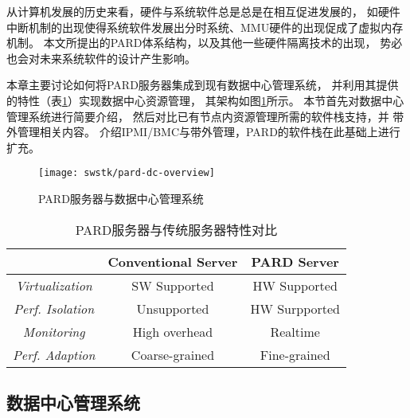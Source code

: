 
从计算机发展的历史来看，硬件与系统软件总是总是在相互促进发展的，
如硬件中断机制的出现使得系统软件发展出分时系统、MMU硬件的出现促成了虚拟内存机制。
本文所提出的PARD体系结构，以及其他一些硬件隔离技术的出现\cite{intel-rdt}，
势必也会对未来系统软件的设计产生影响。

本章主要讨论如何将PARD服务器集成到现有数据中心管理系统，
并利用其提供的特性（表\ref{tab:pard-features}）实现数据中心资源管理，
其架构如图\ref{fig:pard-dc-overview}所示。
本节首先对数据中心管理系统进行简要介绍，
然后对比已有节点内资源管理所需的软件栈支持，并
带外管理相关内容。 介绍IPMI/BMC与带外管理，PARD的软件栈在此基础上进行扩充。

\begin{figure}[tb]
  \centering
  \texttt{[image: swstk/pard-dc-overview]}
  \caption{PARD服务器与数据中心管理系统}
  \label{fig:pard-dc-overview}
\end{figure}

\begin{table}[tb]
\begin{center}
\begin{tabular}{c|c|c}
  \toprule[1.5pt]
  & \textbf{Conventional Server} & \textbf{PARD Server}\\
  \midrule[1pt]
  \emph{Virtualization} & SW Supported & HW Supported\\
  \hline
  \emph{Perf. Isolation} & Unsupported & HW Surpported\\
  \hline
  \emph{Monitoring} & High overhead & Realtime\\
  \hline
  \emph{Perf. Adaption} & Coarse-grained  & Fine-grained\\
  \hline
  \bottomrule[1.5pt]
\end{tabular}
\caption{PARD服务器与传统服务器特性对比}
\label{tab:pard-features}
\end{center}
\end{table}


\subsection{数据中心管理系统}

